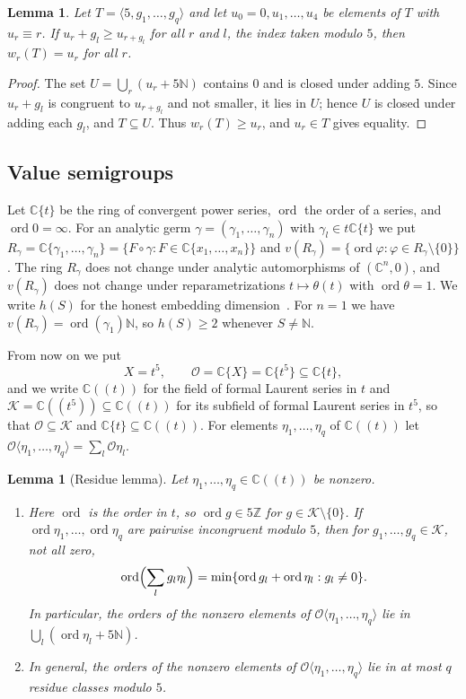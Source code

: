 \documentclass{amsart}
\newtheorem{lemma}[theorem]{Lemma}
\theoremstyle{definition}
\theoremstyle{remark}
\numberwithin{equation}{section}
\newcommand{\N}{\mathbb{N}}
\newcommand{\Z}{\mathbb{Z}}
\newcommand{\C}{\mathbb{C}}
\newcommand{\cO}{\mathcal{O}}
\newcommand{\cK}{\mathcal{K}}
\newcommand{\ord}{\operatorname{ord}}
\newcommand{\gen}[1]{\langle #1\rangle}
\newcommand{\Os}[1]{\cO\langle #1\rangle}
\begin{document}
\begin{lemma}\label{lem:apery}
Let $T=\gen{5,g_1,\dots,g_q}$ and let $u_0=0,u_1,\dots,u_4$ be elements of $T$ with $u_r\equiv r$. If $u_r+g_l\ge u_{r+g_l}$ for all $r$ and $l$, the index taken modulo $5$, then $w_r(T)=u_r$ for all $r$.
\end{lemma}

\begin{proof}
The set $U=\bigcup_r(u_r+5\N)$ contains $0$ and is closed under adding $5$. Since $u_r+g_l$ is congruent to $u_{r+g_l}$ and not smaller, it lies in $U$; hence $U$ is closed under adding each $g_l$, and $T\subseteq U$. Thus $w_r(T)\ge u_r$, and $u_r\in T$ gives equality.
\end{proof}

\subsection{Value semigroups}
Let $\C\{t\}$ be the ring of convergent power series, $\ord$ the order of a series, and $\ord 0=\infty$. For an analytic germ $\gamma=(\gamma_1,\dots,\gamma_n)$ with $\gamma_l\in t\C\{t\}$ we put $R_\gamma=\C\{\gamma_1,\dots,\gamma_n\}=\{F\circ\gamma: F\in\C\{x_1,\dots,x_n\}\}$ and $v(R_\gamma)=\{\ord\varphi:\varphi\in R_\gamma\setminus\{0\}\}$. The ring $R_\gamma$ does not change under analytic automorphisms of $(\C^n,0)$, and $v(R_\gamma)$ does not change under reparametrizations $t\mapsto\theta(t)$ with $\ord\theta=1$. We write $h(S)$ for the honest embedding dimension~\cite[Definition~3.1]{Mon}. For $n=1$ we have $v(R_\gamma)=\ord(\gamma_1)\N$, so $h(S)\ge2$ whenever $S\ne\N$.

From now on we put
\[
X=t^5,\qquad \cO=\C\{X\}=\C\{t^5\}\subseteq\C\{t\},
\]
and we write $\C((t))$ for the field of formal Laurent series in $t$ and $\cK=\C((t^5))\subseteq\C((t))$ for its subfield of formal Laurent series in $t^5$, so that $\cO\subseteq\cK$ and $\C\{t\}\subseteq\C((t))$. For elements $\eta_1,\dots,\eta_q$ of $\C((t))$ let $\Os{\eta_1,\dots,\eta_q}=\sum_l\cO\eta_l$.

\begin{lemma}[Residue lemma]\label{lem:residue}
Let $\eta_1,\dots,\eta_q\in\C((t))$ be nonzero.
\begin{enumerate}
\item[(a)] Here $\ord$ is the order in $t$, so $\ord g\in5\Z$ for $g\in\cK\setminus\{0\}$. If $\ord\eta_1,\dots,\ord\eta_q$ are pairwise incongruent modulo $5$, then for $g_1,\dots,g_q\in\cK$, not all zero,
\[
\ord\Bigl(\sum_{l} g_l\eta_l\Bigr)=\min\{\ord g_l+\ord\eta_l: g_l\ne0\}.
\]
In particular, the orders of the nonzero elements of $\Os{\eta_1,\dots,\eta_q}$ lie in $\bigcup_l(\ord\eta_l+5\N)$.
\item[(b)] In general, the orders of the nonzero elements of $\Os{\eta_1,\dots,\eta_q}$ lie in at most $q$ residue classes modulo $5$.
\end{enumerate}
\end{lemma}
\end{document}

